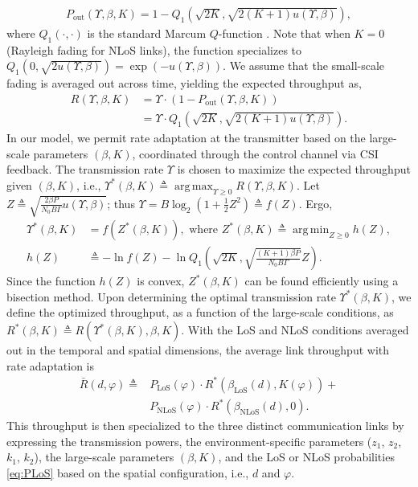 \documentclass[10pt, twocolumn]{IEEEtran}
\theoremstyle{plain}
\theoremstyle{definition}
\theoremstyle{remark}
\DeclareMathOperator*{\argmax}{arg\,max}
\DeclareMathOperator*{\argmin}{arg\,min}
\begin{document}
\begin{align}
	P_{\mathrm{out}}(\Upsilon,\beta,K)=1-Q_{1}\left(\sqrt{2K},\sqrt{2(K+1)u(\Upsilon,\beta)}\right),
\end{align}
where $Q_{1}(\cdot,\cdot)$ is the standard Marcum $Q$-function \cite{Rician}. Note that when $K{=}0$ (Rayleigh fading for NLoS links), the function specializes to $Q_{1}\left(0,\sqrt{2u(\Upsilon,\beta)}\right){=}\exp(-u(\Upsilon,\beta))$. We assume that the small-scale fading is averaged out across time, yielding the expected throughput as,
\begin{align}
	R(\Upsilon,\beta,K)&=\Upsilon\cdot\left(1-P_{\mathrm{out}}(\Upsilon,\beta,K)\right)\nonumber\\
	&=\Upsilon\cdot Q_{1}\left(\sqrt{2K},\sqrt{2(K+1)u(\Upsilon,\beta)}\right).
\end{align}
In our model, we permit rate adaptation at the transmitter based on the large-scale parameters $(\beta,K)$, coordinated through the control channel via CSI feedback. The transmission rate $\Upsilon$ is chosen to maximize the expected throughput given $(\beta,K)$, i.e., $\Upsilon^{*}(\beta,K){\triangleq}\argmax_{\Upsilon{\geq}0}R(\Upsilon,\beta,K).$ Let $Z{\triangleq}\sqrt{\frac{2{\beta}P}{N_{0}B\Gamma}u(\Upsilon,\beta)}$; thus $\Upsilon{=}B\log_{2}\left(1{+}\frac{1}{2}Z^{2}\right){\triangleq}f(Z)$. Ergo,
\begin{align*}
    \Upsilon^{*}(\beta,K)&{=}f(Z^{*}(\beta,K)),\text{ where }
    Z^{*}(\beta,K){\triangleq}\argmin_{Z{\geq}0}h(Z),\\
    h(Z)&{\triangleq}{-}\ln f(Z){-}\ln Q_{1}\left(\sqrt{2K},\sqrt{\frac{(K{+}1)\beta P}{N_{0}B\Gamma}}Z\right).
\end{align*}
Since the function $h(Z)$ is convex, $Z^{*}(\beta,K)$ can be found efficiently using a bisection method. Upon determining the optimal transmission rate $\Upsilon^{*}(\beta,K)$, we define the optimized throughput, as a function of the large-scale conditions, as $R^{*}(\beta,K) \triangleq R(\Upsilon^{*}(\beta,K),\beta,K)$. With the LoS and NLoS conditions averaged out in the temporal and spatial dimensions, the average link throughput with rate adaptation is
\begin{align}\label{TBar}
	\bar{R}(d,\varphi)\triangleq &P_{\mathrm{LoS}}(\varphi)\cdot R^{*}(\beta_{\mathrm{LoS}}(d),K(\varphi))+\nonumber\\&P_{\mathrm{NLoS}}(\varphi)\cdot R^{*}(\beta_{\mathrm{NLoS}}(d),0).
\end{align}
This throughput is then specialized to the three distinct communication links by expressing the transmission powers, the environment-specific parameters ($z_{1}$, $z_{2}$, $k_{1}$, $k_{2}$), the large-scale parameters $(\beta,K)$, and the LoS or NLoS probabilities \eqref{eq:PLoS} based on the spatial configuration, i.e., $d$ and $\varphi$.
\end{document}
